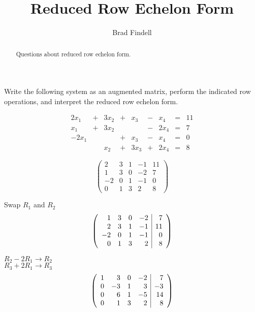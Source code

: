 \documentclass{ximera}
\title{Reduced Row Echelon Form}
\author{Brad Findell}
\begin{document}
\begin{abstract}
Questions about reduced row echelon form. 
\end{abstract}
\maketitle



\begin{exercise}
Write the following system as an augmented matrix, perform the indicated row operations, and interpret the reduced row echelon form. 

\[
\begin{array}{rcrcrcrcrc}
 2x_1 & + & 3x_2 & + & x_3  & - &  x_4 & = & 11 \\
 x_1  & + & 3x_2 &   &      & - & 2x_4 & = &  7 \\
-2x_1 &   &      & + & x_3  & - &  x_4 & = &  0 \\
      &   & x_2  & + & 3x_3 & + & 2x_4 & = &  8
\end{array}
\]

\begin{prompt}
\[
\left(\begin{array}{rrrr|r}
     2 &  3 &  1 &  -1 & 11 \\
     1 &  3 &  0 &  -2 &  7 \\
    -2 &  0 &  1 &  -1 &  0 \\
     0 &  1 &  3 &   2 &  8 
\end{array}\right)
\]

Swap $R_1$ and   $R_2$  
\[
\left(\begin{array}{rrrr|r}
     1 &  3 &  0 &  -2 &  7 \\
     {2} &  {3} &  {1} &  {-1} & {11} \\
    -2 &  0 &  1 &  -1 &  0 \\
     0 &  1 &  3 &   2 &  8 
\end{array}\right)
\]

$R_2-2R_1   \rightarrow  R_2$ \\
$R_3 + 2R_1   \rightarrow R_3$
\[
\left(\begin{array}{rrrr|r}
     1 &  3 &  0 &  -2 &  7 \\
     {0} &  {-3} &  {1} &  {3} & {-3} \\
     {0} &  {6} &  {1} &  {-5} &  {14} \\
     0 &  1 &  3 &   2 &  8 
\end{array}\right)
\]


\end{prompt}
\end{exercise}
\end{document}
